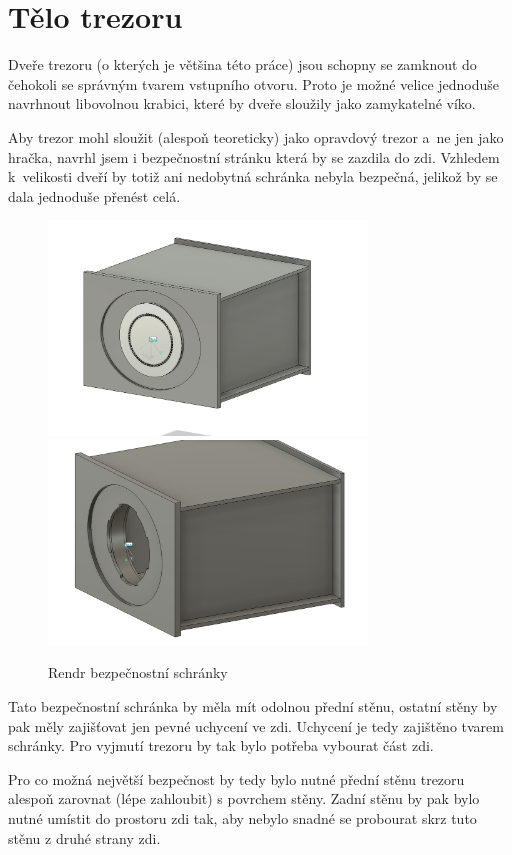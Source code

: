 \section{Tělo trezoru}
Dveře trezoru (o kterých je většina této práce) jsou schopny se zamknout do čehokoli se správným tvarem vstupního otvoru. 
Proto je možné velice jednoduše navrhnout libovolnou krabici, které by dveře sloužily jako zamykatelné víko. 

Aby trezor mohl sloužit (alespoň teoreticky) jako opravdový trezor a~ne jen jako hračka, navrhl jsem i bezpečnostní stránku která by se zazdila do zdi. 
Vzhledem k~velikosti dveří by totiž ani nedobytná schránka nebyla bezpečná, jelikož by se dala jednoduše přenést celá.

\begin{figure}[htbp]
    \centering
    \includegraphics[width=240pt]{kapitoly/obrazky/E4/bedna/bedna.png}
    \includegraphics[width=240pt]{kapitoly/obrazky/E4/bedna/jen-bedna.png}
    \caption{Rendr bezpečnostní schránky}
    \label{fig:E4-bedna}
\end{figure}

Tato bezpečnostní schránka by měla mít odolnou přední stěnu, ostatní stěny by pak měly zajišťovat jen pevné uchycení ve zdi.
Uchycení je tedy zajištěno tvarem schránky. Pro vyjmutí trezoru by tak bylo potřeba vybourat část zdi.
\enlargethispage{5mm}

Pro co možná největší bezpečnost by tedy bylo nutné přední stěnu trezoru alespoň zarovnat (lépe zahloubit) s povrchem stěny.
Zadní stěnu by pak bylo nutné umístit do prostoru zdi tak, aby nebylo snadné se probourat skrz tuto stěnu z druhé strany zdi.  %